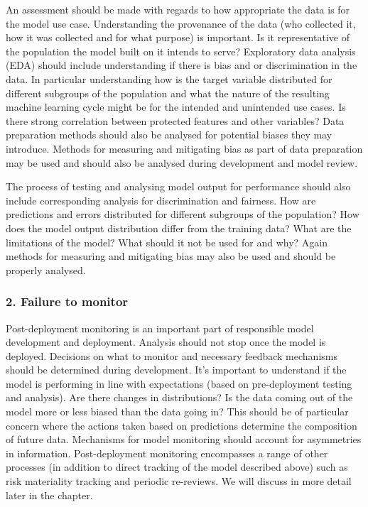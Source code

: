 An assessment should be made with regards to how appropriate the data is for the model use case. Understanding the provenance of the data (who collected it, how it was collected and for what purpose) is important. Is it representative of the population the model built on it intends to serve? Exploratory data analysis (EDA) should include understanding if there is bias and or discrimination in the data. In particular understanding how is the target variable distributed for different subgroups of the population and what the nature of the resulting machine learning cycle might be for the intended and unintended use cases. Is there strong correlation between protected features and other variables? Data preparation methods should also be analysed for potential biases they may introduce. Methods for measuring and mitigating bias as part of data preparation may be used and should also be analysed during development and model review.

The process of testing and analysing model output for performance should also include corresponding analysis for discrimination and fairness. How are predictions and errors distributed for different subgroups of the population? How does the model output distribution differ from the training data? What are the limitations of the model? What should it not be used for and why? Again methods for measuring and mitigating bias may also be used and should be properly analysed.

\subsubsection*{2. Failure to monitor}

Post-deployment monitoring is an important part of responsible model development and deployment. Analysis should not stop once the model is deployed. Decisions on what to monitor and necessary feedback mechanisms should be determined during development. It's important to understand if the model is performing in line with expectations (based on pre-deployment testing and analysis). Are there changes in distributions? Is the data coming out of the model more or less biased than the data going in? This should be of particular concern where the actions taken based on predictions determine the composition of future data. Mechanisms for model monitoring should account for asymmetries in information. Post-deployment monitoring encompasses a range of other processes (in addition to direct tracking of the model described above) such as risk materiality tracking and periodic re-reviews. We will discuss in more detail later in the chapter.

